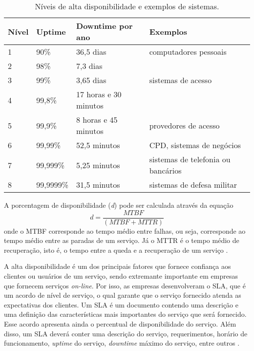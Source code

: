 \begin{table}[h!]
\caption {Níveis de alta disponibilidade e exemplos de sistemas.}
\label{tab:dispniveis}
\begin{center}
\begin{tabular}{|l|l|l|l|}\hline
\textbf{Nível} & \textbf{Uptime} & \textbf{Downtime por ano} & \textbf{Exemplos} \\\hline
1 & 90\% & 36,5 dias & computadores pessoais\\\hline
2 & 98\% & 7,3 dias & \\\hline
3 & 99\% & 3,65 dias & sistemas de acesso\\\hline
4 & 99,8\% & 17 horas e 30 minutos & \\\hline
5 & 99,9\% & 8 horas e 45 minutos & provedores de acesso\\\hline
6 & 99,99\% & 52,5 minutos & CPD, sistemas de negócios\\\hline
7 & 99,999\% & 5,25 minutos & sistemas de telefonia ou bancários\\\hline
8 & 99,9999\% & 31,5 minutos & sistemas de defesa militar\\\hline
\end{tabular}
\end{center}
\end{table}

A porcentagem de disponibilidade (\textit{d}) pode ser calculada através da equação
\begin{equation}
d = \frac{MTBF}{(MTBF + MTTR)}
\label{disponibilidade}
\end{equation}
onde o \ac{MTBF} corresponde ao tempo médio entre falhas, ou seja, corresponde ao tempo médio entre as paradas de um serviço. Já o \ac{MTTR} é o 
tempo médio de recuperação, isto é, o tempo entre a queda e a recuperação de um serviço \cite{goncalves2009}.

A alta disponibilidade é um dos principais fatores que fornece confiança aos clientes ou usuários de um serviço, sendo extremante importante 
em empresas que fornecem serviços \textit{on-line}. Por isso, as empresas desenvolveram o \ac{SLA}, que é um acordo de nível de serviço, 
o qual garante que o serviço fornecido atenda as expectativas dos clientes. Um \ac{SLA} é um documento contendo uma descrição e uma definição 
das características mais importantes do serviço que será fornecido. Esse acordo apresenta ainda o percentual de disponibilidade do serviço.
Além disso, um \ac{SLA} deverá conter uma descrição do serviço, requerimentos, horário de funcionamento, \textit{uptime} do serviço, 
\textit{downtime} máximo do serviço, entre outros \cite{smith2010}.

